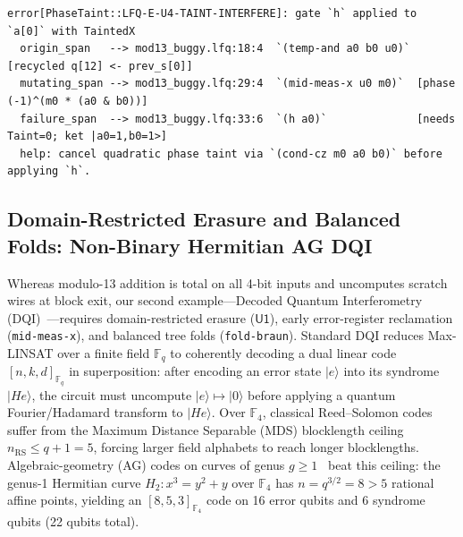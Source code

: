 \documentclass[acmsmall,screen,anonymous]{acmart}
\DeclareRobustCommand{\_}{\ifmmode\text{\char95}\else\char95\penalty0\relax\fi}
\theoremstyle{plain}
\begin{document}
\begin{lstlisting}[basicstyle=\ttfamily\scriptsize,columns=fullflexible,breaklines=true,caption={Three-span resugared diagnostic emitted by \texttt{lakefillqc --diagnostics-human} when Hadamard interference is attempted on a wire carrying uncanceled $X$-basis phase taint across a chordally recycled ancilla.},label={alg:diag_box}]
error[PhaseTaint::LFQ-E-U4-TAINT-INTERFERE]: gate `h` applied to `a[0]` with TaintedX
  origin_span   --> mod13_buggy.lfq:18:4  `(temp-and a0 b0 u0)` [recycled q[12] <- prev_s[0]]
  mutating_span --> mod13_buggy.lfq:29:4  `(mid-meas-x u0 m0)`  [phase (-1)^(m0 * (a0 & b0))]
  failure_span  --> mod13_buggy.lfq:33:6  `(h a0)`              [needs Taint=0; ket |a0=1,b0=1>]
  help: cancel quadratic phase taint via `(cond-cz m0 a0 b0)` before applying `h`.
\end{lstlisting}

\subsection{Domain-Restricted Erasure and Balanced Folds: Non-Binary Hermitian AG DQI}

Whereas modulo-13 addition is total on all 4-bit inputs and uncomputes scratch wires at block exit, our second example---Decoded Quantum Interferometry (DQI)~\cite{jordan2024}---requires domain-restricted erasure ($\mathsf{U1}$), early error-register reclamation (\texttt{mid-meas-x}), and balanced tree folds (\texttt{fold-braun}). Standard DQI reduces Max-LINSAT over a finite field $\mathbb{F}_q$ to coherently decoding a dual linear code $[n, k, d]_{\mathbb{F}_q}$ in superposition: after encoding an error state $|e\rangle$ into its syndrome $|H e\rangle$, the circuit must uncompute $|e\rangle \mapsto |0\rangle$ before applying a quantum Fourier/Hadamard transform to $|H e\rangle$. Over $\mathbb{F}_4$, classical Reed--Solomon codes suffer from the Maximum Distance Separable (MDS) blocklength ceiling $n_{\mathrm{RS}} \le q + 1 = 5$, forcing larger field alphabets to reach longer blocklengths. Algebraic-geometry (AG) codes on curves of genus $g \ge 1$~\cite{stichtenoth2009,fengrao1993} beat this ceiling: the genus-1 Hermitian curve $H_2 : x^3 = y^2 + y$ over $\mathbb{F}_4$ has $n = q^{3/2} = 8 > 5$ rational affine points, yielding an $[8, 5, 3]_{\mathbb{F}_4}$ code on 16 error qubits and 6 syndrome qubits (22 qubits total).
\end{document}
